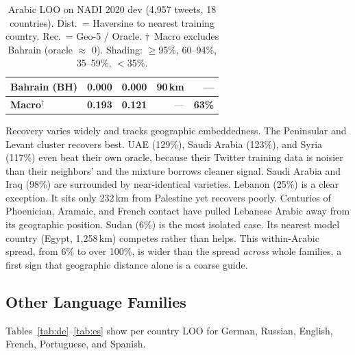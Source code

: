 \documentclass[11pt]{article}
\begin{document}
\begin{table}[t]
\begin{tabular}{lrrrr}
\midrule
Bahrain (BH)      & 0.000 & 0.000 &   90\,km & --- \\
\midrule
\textbf{Macro}$^\dagger$
  & \textbf{0.193} & \textbf{0.121} & --- & \textbf{63\%} \\
\bottomrule
\end{tabular}
\caption{Arabic LOO on NADI 2020 dev (4{,}957 tweets, 18 countries).
  Dist.\ = Haversine to nearest training country.
  Rec.\ = Geo-5 / Oracle.
  $\dagger$~Macro excludes Bahrain (oracle $\approx$ 0).
  Shading: \colorbox{best}{$\geq$95\%}, \colorbox{high}{60--94\%}, \colorbox{mid}{35--59\%}, \colorbox{low}{$<$35\%}.}
\label{tab:loo}
\end{table}

Recovery varies widely and tracks geographic embeddedness.
The Peninsular and Levant cluster recovers best.
UAE (129\%), Saudi Arabia (123\%), and Syria (117\%) even beat their own oracle, because their Twitter training data is noisier than their neighbors' and the mixture borrows cleaner signal.
Saudi Arabia and Iraq (98\%) are surrounded by near-identical varieties.
Lebanon (25\%) is a clear exception.
It sits only 232\,km from Palestine yet recovers poorly.
Centuries of Phoenician, Aramaic, and French contact have pulled Lebanese Arabic away from its geographic position.
Sudan (6\%) is the most isolated case.
Its nearest model country (Egypt, 1{,}258\,km) competes rather than helps.
This within-Arabic spread, from 6\% to over 100\%, is wider than the spread \emph{across} whole families, a first sign that geographic distance alone is a coarse guide.

\subsection{Other Language Families}
\label{sec:multi}

Tables~\ref{tab:de}--\ref{tab:es} show per country LOO for German, Russian, English, French, Portuguese, and Spanish.
\end{document}
